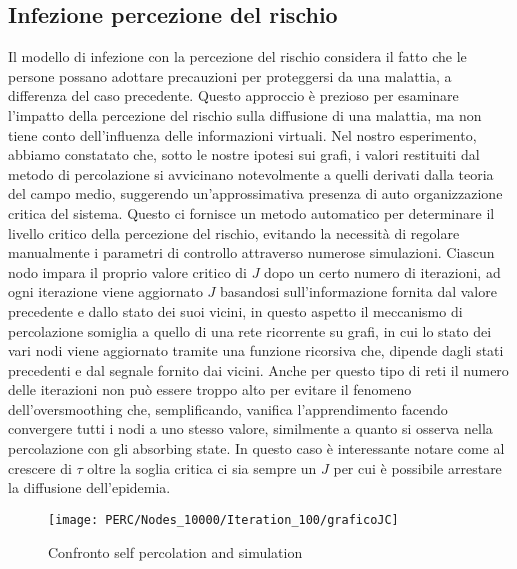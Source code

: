 \subsection{Infezione percezione del rischio}\label{subsec:res-infezione-con-la-percezione-del-rischio}
    Il modello di infezione con la percezione del rischio considera il fatto che le persone possano adottare precauzioni
    per proteggersi da una malattia, a differenza del caso precedente.
    Questo approccio è prezioso per esaminare l'impatto della percezione del rischio sulla diffusione di una malattia,
    ma non tiene conto dell'influenza delle informazioni virtuali.
    Nel nostro esperimento, abbiamo constatato che, sotto le nostre ipotesi sui grafi, i valori restituiti dal metodo di
    percolazione si avvicinano notevolmente a quelli derivati dalla teoria del campo medio, suggerendo un'approssimativa
    presenza di auto organizzazione critica del sistema.
    Questo ci fornisce un metodo automatico per determinare il livello critico della percezione del rischio, evitando la
    necessità di regolare manualmente i parametri di controllo attraverso numerose simulazioni.
    Ciascun nodo impara il proprio valore critico di $J$ dopo un certo numero di iterazioni, ad ogni iterazione
    viene aggiornato $J$ basandosi sull'informazione fornita dal valore precedente e dallo stato dei suoi vicini, in
    questo aspetto il meccanismo di percolazione somiglia a quello di una rete ricorrente su grafi, in cui lo stato dei
    vari nodi viene aggiornato tramite una funzione ricorsiva che, dipende dagli stati precedenti e dal segnale fornito dai
    vicini.
    Anche per questo tipo di reti il numero delle iterazioni non può essere troppo alto per evitare il fenomeno
    dell'oversmoothing che, semplificando, vanifica l'apprendimento facendo convergere tutti i nodi a uno stesso valore,
    similmente a quanto si osserva nella percolazione con gli absorbing state.
    In questo caso è interessante notare come al crescere di $\tau$ oltre la soglia critica ci sia sempre un $J$ per cui è
    possibile arrestare la diffusione dell'epidemia.

    \begin{figure}[H]
        \texttt{[image: PERC/Nodes\_10000/Iteration\_100/graficoJC]}\caption{Confronto self percolation and simulation}
        \label{fig:graficoJC}
    \end{figure}

